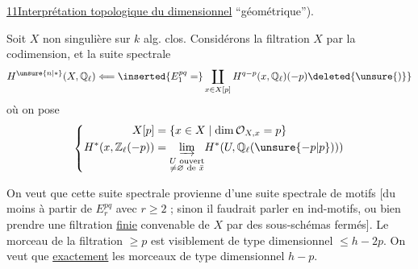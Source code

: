 \uline{11}\quad \uline{Interprétation topologique du }  \uline{dimensionnel}  ``géométrique'').

Soit $X$  non singulière sur $k$ alg. clos. Considérons la filtration $X$ par la codimension, et la suite spectrale
\[
H^{\unsure{n|*}}(X,\mathbb Q_\ell)\Longleftarrow\inserted{E_1^{pq}=}\coprod_{x\in X[p]} H^{q-p}(x,\mathbb Q_\ell)(-p)\deleted{\unsure{)}}
\]
où on pose
\[
\left\{\begin{aligned}
X[p]&=\{x\in X\mid\dim\mathcal O_{X,x}=p\}\\
H^*(x,\mathbb Z_\ell(-p))&=\underset{\substack{U\text{ ouvert}\\\ne\varnothing\text{ de }\bar x}}{\underrightarrow{\lim}} H^*(U,\mathbb Q_\ell(\unsure{-p|p})))
\end{aligned}\right.
\]

On veut que  cette suite spectrale provienne d'une suite spectrale de motifs [du moins à partir de $E_r^{pq}$ avec $r\geq2$ ; sinon il faudrait parler en ind-motifs, ou bien prendre une filtration \uline{finie} convenable de $X$ par des sous-schémas fermés]. Le morceau  de la filtration $\geq p$ est visiblement de type dimensionnel $\leq h-2p$. On veut que   \uline{exactement} les morceaux de type dimensionnel $h-p$.
